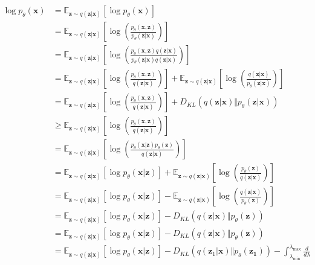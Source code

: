 \documentclass[ oneside,%
                    author={George Herbert},
                    degree={MSci},
                     title={Video Diffusion Models for Climate Simulations},
                  subtitle={}]{dissertation}
\begin{document}
\begin{align}
      \log p_\theta(\mathbf{x})&=\mathbb{E}_{\mathbf{z}\sim q(\mathbf{z}|\mathbf{x})}\left[\log p_\theta(\mathbf{x})\right]\\
      &=\mathbb{E}_{\mathbf{z}\sim q(\mathbf{z}|\mathbf{x})}\left[\log\left(\frac{p_\theta(\mathbf{x},\mathbf{z})}{p_\theta(\mathbf{z}|\mathbf{x})}\right)\right]\\
      &=\mathbb{E}_{\mathbf{z}\sim q(\mathbf{z}|\mathbf{x})}\left[\log\left(\frac{p_\theta(\mathbf{x},\mathbf{z})q(\mathbf{z}|\mathbf{x})}{p_\theta(\mathbf{z}|\mathbf{x})q(\mathbf{z}|\mathbf{x})}\right)\right]\\
      &=\mathbb{E}_{\mathbf{z}\sim q(\mathbf{z}|\mathbf{x})}\left[\log\left(\frac{p_\theta(\mathbf{x},\mathbf{z})}{q(\mathbf{z}|\mathbf{x})}\right)\right]+\mathbb{E}_{\mathbf{z}\sim q(\mathbf{z}|\mathbf{x})}\left[\log\left(\frac{q(\mathbf{z}|\mathbf{x})}{p_\theta(\mathbf{z}|\mathbf{x})}\right)\right]\\
      &=\mathbb{E}_{\mathbf{z}\sim q(\mathbf{z}|\mathbf{x})}\left[\log\left(\frac{p_\theta(\mathbf{x},\mathbf{z})}{q(\mathbf{z}|\mathbf{x})}\right)\right]+D_{KL}(q(\mathbf{z}|\mathbf{x})\Vert p_\theta(\mathbf{z}|\mathbf{x}))\\
      &\ge \mathbb{E}_{\mathbf{z}\sim q(\mathbf{z}|\mathbf{x})}\left[\log\left(\frac{p_\theta(\mathbf{x},\mathbf{z})}{q(\mathbf{z}|\mathbf{x})}\right)\right]\\
      &=\mathbb{E}_{\mathbf{z}\sim q(\mathbf{z}|\mathbf{x})}\left[\log\left(\frac{p_\theta(\mathbf{x}|\mathbf{z})p_\theta(\mathbf{z})}{q(\mathbf{z}|\mathbf{x})}\right)\right]\\
      &=\mathbb{E}_{\mathbf{z}\sim q(\mathbf{z}|\mathbf{x})}\left[\log p_\theta(\mathbf{x}|\mathbf{z})\right]+\mathbb{E}_{\mathbf{z}\sim q(\mathbf{z}|\mathbf{x})}\left[\log\left(\frac{p_\theta(\mathbf{z})}{q(\mathbf{z}|\mathbf{x})}\right)\right]\\
      &=\mathbb{E}_{\mathbf{z}\sim q(\mathbf{z}|\mathbf{x})}\left[\log p_\theta(\mathbf{x}|\mathbf{z})\right]-\mathbb{E}_{\mathbf{z}\sim q(\mathbf{z}|\mathbf{x})}\left[\log\left(\frac{q(\mathbf{z}|\mathbf{x})}{p_\theta(\mathbf{z})}\right)\right]\\
      &=\mathbb{E}_{\mathbf{z}\sim q(\mathbf{z}|\mathbf{x})}\left[\log p_\theta(\mathbf{x}|\mathbf{z})\right]-D_{KL}(q(\mathbf{z}|\mathbf{x})\Vert p_\theta(\mathbf{z}))\\
      &=\mathbb{E}_{\mathbf{z}\sim q(\mathbf{z}|\mathbf{x})}\left[\log p_\theta(\mathbf{x}|\mathbf{z})\right]-D_{KL}(q(\mathbf{z}|\mathbf{x})\Vert p_\theta(\mathbf{z}))\\
      &=\mathbb{E}_{\mathbf{z}\sim q(\mathbf{z}|\mathbf{x})}\left[\log p_\theta(\mathbf{x}|\mathbf{z})\right]-D_{KL}(q(\mathbf{z}_1|\mathbf{x})\Vert p_\theta(\mathbf{z_1}))-\int_{\lambda_{\min}}^{\lambda_{\max}}\frac{d}{d\lambda}
\end{align}

\end{document}
